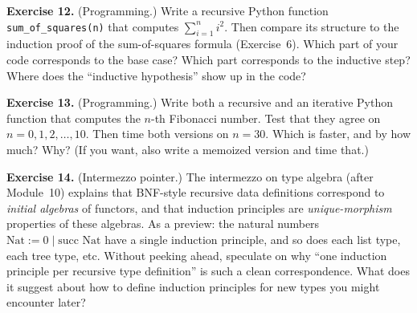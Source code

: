 \documentclass[11pt]{article}
\begin{document}
\textbf{Exercise 12.}\label{ex:m8:12} (Programming.) Write a recursive Python function \texttt{sum\_of\_squares(n)} that computes $\displaystyle\sum_{i=1}^{n} i^2$. Then compare its structure to the induction proof of the sum-of-squares formula (Exercise~6). Which part of your code corresponds to the base case? Which part corresponds to the inductive step? Where does the ``inductive hypothesis'' show up in the code?

\bigskip
\textbf{Exercise 13.}\label{ex:m8:13} (Programming.) Write both a recursive and an iterative Python function that computes the $n$-th Fibonacci number. Test that they agree on $n = 0, 1, 2, \ldots, 10$. Then time both versions on $n = 30$. Which is faster, and by how much? Why? (If you want, also write a memoized version and time that.)

\bigskip
\textbf{Exercise 14.}\label{ex:m8:14} (Intermezzo pointer.) The intermezzo on type algebra (after Module~10) explains that BNF-style recursive data definitions correspond to \emph{initial algebras} of functors, and that induction principles are \emph{unique-morphism} properties of these algebras. As a preview: the natural numbers $\text{Nat} := 0 \mid \text{succ Nat}$ have a single induction principle, and so does each list type, each tree type, etc. Without peeking ahead, speculate on why ``one induction principle per recursive type definition'' is such a clean correspondence. What does it suggest about how to define induction principles for new types you might encounter later?
\end{document}
